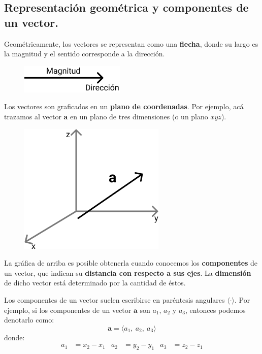 \documentclass[12pt]{article}
\begin{document}
\subsection{Representación geométrica y componentes de un vector.}

Geométricamente, los vectores se representan como una \textbf{flecha}, donde su largo es la magnitud y el sentido corresponde a la dirección.


\begin{figure}[hbt!]
\centering
\includegraphics[scale=0.6]{img/vector-arrow.jpg}
\end{figure}

Los vectores son graficados en un \textbf{plano de coordenadas}. Por ejemplo, acá trazamos al vector $\mathbf{a}$ en un plano de tres dimensiones (o un plano $xyz$).

\begin{figure}[hbt!]
\centering
\includegraphics[scale=0.5]{img/vector-xyz-plane.jpg}
\end{figure}

La gráfica de arriba es posible obtenerla cuando conocemos los \textbf{componentes} de un vector, que indican su \textbf{distancia con respecto a sus ejes}. La \textbf{dimensión} de dicho vector está determinado por la cantidad de éstos.

Los componentes de un vector suelen escribirse en paréntesis angulares $\langle \cdot \rangle$. Por ejemplo, si los componentes de un vector $\mathbf{a}$ son $a_{1}$, $a_{2}$ y $a_{3}$, entonces podemos denotarlo como:
\[
  \mathbf{a} = \langle a_{1}, \ a_{2}, \ a_{3} \rangle
\]
donde:
\begin{align*}
  a_{1} &= x_{2} - x_{1} & a_{2} &= y_{2} - y_{1} & a_{3} &= z_{2} - z_{1}
\end{align*}
\end{document}
